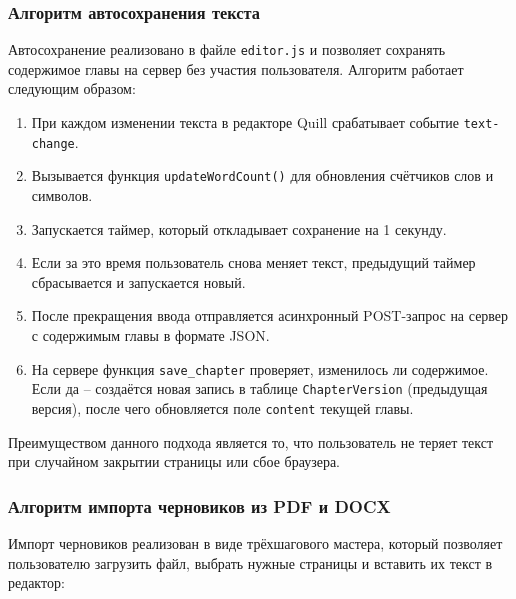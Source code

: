\subsubsection{Алгоритм автосохранения текста}

Автосохранение реализовано в файле \texttt{editor.js} и позволяет сохранять содержимое главы на сервер без участия пользователя. Алгоритм работает следующим образом:

\begin{enumerate}
    \item При каждом изменении текста в редакторе Quill срабатывает событие \texttt{text-change}.
    \item Вызывается функция \texttt{updateWordCount()} для обновления счётчиков слов и символов.
    \item Запускается таймер, который откладывает сохранение на 1 секунду.
    \item Если за это время пользователь снова меняет текст, предыдущий таймер сбрасывается и запускается новый.
    \item После прекращения ввода отправляется асинхронный POST-запрос на сервер с содержимым главы в формате JSON.
    \item На сервере функция \texttt{save\_chapter} проверяет, изменилось ли содержимое. Если да -- создаётся новая запись в таблице \texttt{ChapterVersion} (предыдущая версия), после чего обновляется поле \texttt{content} текущей главы.
\end{enumerate}

Преимуществом данного подхода является то, что пользователь не теряет текст при случайном закрытии страницы или сбое браузера.

\subsubsection{Алгоритм импорта черновиков из PDF и DOCX}

Импорт черновиков реализован в виде трёхшагового мастера, который позволяет пользователю загрузить файл, выбрать нужные страницы и вставить их текст в редактор:

